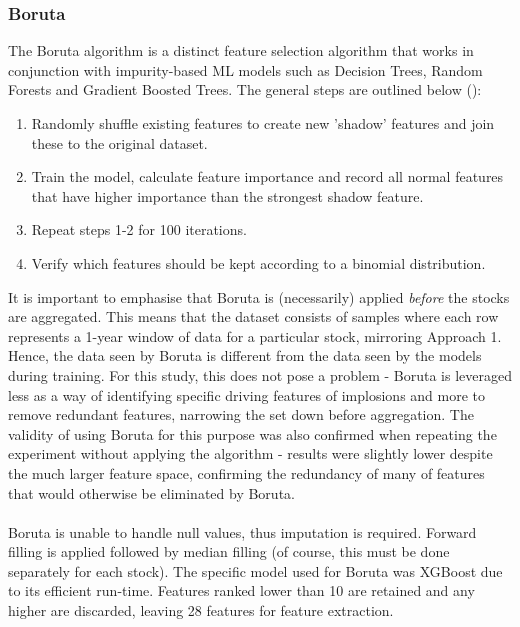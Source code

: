 \documentclass[a4paper]{report}
\begin{document}
\subsubsection{Boruta}
The Boruta algorithm is a distinct feature selection algorithm that works in conjunction with impurity-based ML models such as Decision Trees, Random Forests and Gradient Boosted Trees. The 
general steps are outlined below (\cite{boruta}):
\begin{enumerate}
  \item Randomly shuffle existing features to create new 'shadow' features and join these to the original dataset.
  \item Train the model, calculate feature importance and record all normal features that have higher importance than the strongest shadow feature.
  \item Repeat steps 1-2 for 100 iterations.
  \item Verify which features should be kept according to a binomial distribution.
\end{enumerate}It 
is important to emphasise that Boruta is (necessarily) applied \textit{before} the stocks are aggregated. This means that the dataset consists of samples where each row represents a 1-year window of data for a particular stock,
mirroring Approach 1. Hence, the data seen by Boruta is different from the data seen by the models during training. For this study, this does not pose a problem - 
Boruta is leveraged less as a way of identifying specific driving features of implosions and more to remove redundant features, narrowing the set down before aggregation. The 
validity of using Boruta for this purpose was also confirmed when repeating the experiment without applying the algorithm - results were slightly lower despite 
the much larger feature space, confirming the redundancy of many of features that would otherwise be eliminated by Boruta.\\\\Boruta 
is unable to handle null values, thus imputation is required. Forward filling is applied followed by median filling (of course, this must be done separately for each stock). The specific 
model used for Boruta was XGBoost due to its efficient run-time. Features ranked lower than 10 are retained and any higher are discarded, leaving 28 features for feature extraction.
\end{document}

